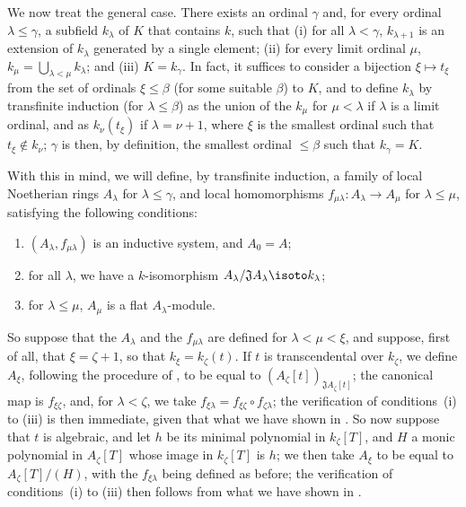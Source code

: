 \begin{env}[10.3.1.4]
\label{0.10.3.1.4}
We now treat the general case.
There exists an ordinal $\gamma$ and, for every ordinal $\lambda\leq\gamma$, a subfield $k_\lambda$ of $K$ that contains $k$, such that (i) for all $\lambda<\gamma$, $k_{\lambda+1}$ is an extension of $k_\lambda$ generated by a single element; (ii) for every limit ordinal $\mu$, $k_\mu=\bigcup_{\lambda<\mu}k_\lambda$; and (iii) $K=k_\gamma$.
In fact, it suffices to consider a bijection $\xi\mapsto t_\xi$ from the set of ordinals $\xi\leq\beta$ (for some suitable $\beta$) to $K$, and to define $k_\lambda$ by transfinite induction (for $\lambda\leq\beta$) as the union of the $k_\mu$ for $\mu<\lambda$ if $\lambda$ is a limit ordinal, and as $k_\nu(t_\xi)$ if $\lambda=\nu+1$, where $\xi$ is the smallest ordinal such that $t_\xi\not\in k_\nu$;
$\gamma$ is then, by definition, the smallest ordinal $\leq\beta$ such that $k_\gamma=K$.

With this in mind, we will define, by transfinite induction, a family of local Noetherian rings $A_\lambda$ for $\lambda\leq\gamma$, and local homomorphisms $f_{\mu\lambda}:A_\lambda\to A_\mu$ for $\lambda\leq\mu$, satisfying the following conditions:
\begin{enumerate}
  \item[(i)] $(A_\lambda,f_{\mu\lambda})$ is an inductive system, and $A_0=A$;
  \item[(ii)] for all $\lambda$, we have a $k$-isomorphism $A_\lambda/\mathfrak{J}A_\lambda\isoto k_\lambda$;
  \item[(iii)] for $\lambda\leq\mu$, $A_\mu$ is a flat $A_\lambda$-module.
\end{enumerate}

So suppose that the $A_\lambda$ and the $f_{\mu\lambda}$ are defined for $\lambda<\mu<\xi$, and suppose, first of all, that $\xi=\zeta+1$, so that $k_\xi=k_\zeta(t)$.
If $t$ is transcendental over $k_\zeta$, we define $A_\xi$, following the procedure of , to be equal to $(A_\zeta[t])_{\mathfrak{J}A_\zeta[t]}$;
the canonical map is $f_{\xi\zeta}$, and, for $\lambda<\zeta$, we take $f_{\xi\lambda}=f_{\xi\zeta}\circ f_{\zeta\lambda}$;
the verification of conditions~(i) to (iii) is then immediate, given that what we have shown in .
So now suppose that $t$ is algebraic, and let $h$ be its minimal polynomial in $k_\zeta[T]$, and $H$ a monic polynomial in $A_\zeta[T]$ whose image in $k_\zeta[T]$ is $h$;
we then take $A_\xi$ to be equal to $A_\zeta[T]/(H)$, with the $f_{\xi\lambda}$ being defined as before;
the verification of conditions~(i) to (iii) then follows from what we have shown in .


\end{env}
